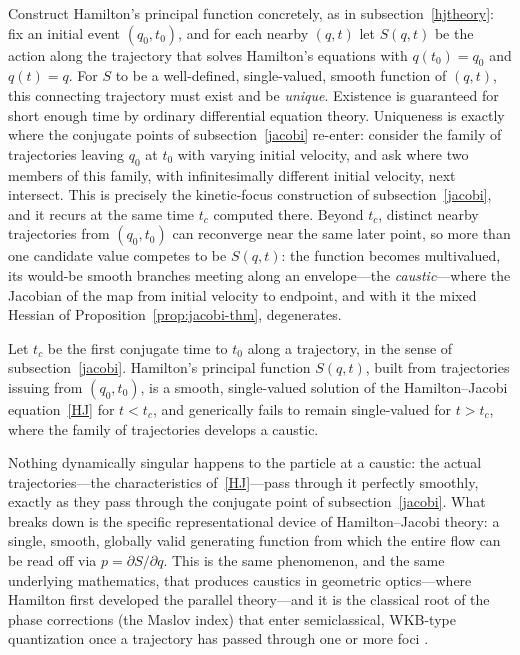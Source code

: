Construct Hamilton's principal function concretely, as in
subsection~\ref{hjtheory}: fix an initial event $(q_0,t_0)$, and for each
nearby $(q,t)$ let $S(q,t)$ be the action along the trajectory that solves
Hamilton's equations with $q(t_0)=q_0$ and $q(t)=q$. For $S$ to be a
well-defined, single-valued, smooth function of $(q,t)$, this connecting
trajectory must exist and be \emph{unique}. Existence is guaranteed for short
enough time by ordinary differential equation theory. Uniqueness is exactly
where the conjugate points of subsection~\ref{jacobi} re-enter: consider the
family of trajectories leaving $q_0$ at $t_0$ with varying initial velocity,
and ask where two members of this family, with infinitesimally different
initial velocity, next intersect. This is precisely the kinetic-focus
construction of subsection~\ref{jacobi}, and it recurs at the same time $t_c$
computed there. Beyond $t_c$, distinct nearby trajectories from $(q_0,t_0)$ can
reconverge near the same later point, so more than one candidate value competes
to be $S(q,t)$: the function becomes multivalued, its would-be smooth branches
meeting along an envelope---the \emph{caustic}---where the Jacobian of the map
from initial velocity to endpoint, and with it the mixed Hessian of
Proposition~\ref{prop:jacobi-thm}, degenerates.

\begin{proposition}
\label{prop:caustic}
Let $t_c$ be the first conjugate time to $t_0$ along a trajectory, in the sense
    of subsection~\ref{jacobi}. Hamilton's principal function $S(q,t)$, built
    from trajectories issuing from $(q_0,t_0)$, is a smooth, single-valued
    solution of the Hamilton--Jacobi equation~\eqref{HJ} for $t<t_c$, and
    generically fails to remain single-valued for $t>t_c$, where the family of
    trajectories develops a caustic.
\end{proposition}

Nothing dynamically singular happens to the particle at a caustic: the actual
trajectories---the characteristics of~\eqref{HJ}---pass through it perfectly
smoothly, exactly as they pass through the conjugate point of
subsection~\ref{jacobi}. What breaks down is the specific representational
device of Hamilton--Jacobi theory: a single, smooth, globally valid generating
function from which the entire flow can be read off via $p=\partial S/\partial
q$. This is the same phenomenon, and the same underlying mathematics, that
produces caustics in geometric optics---where Hamilton first developed the
parallel theory---and it is the classical root of the phase corrections (the
Maslov index) that enter semiclassical, WKB-type quantization once a trajectory
has passed through one or more foci \cite{gray2009}.

